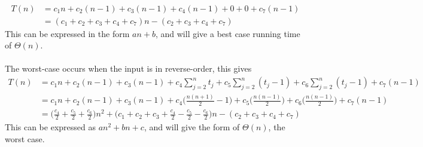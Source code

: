 \documentclass{article}
\begin{document}
\\
\begin{equation*}
\begin{split}
T(n) & = c_1n + c_2(n-1) + c_3(n-1) + c_4(n-1) + 0 + 0 + c_7(n-1) \\
  & = (c_1 + c_2 + c_3 + c_4 + c_7)n - (c_2 + c_3 + c_4 + c_7)
\end{split}
\end{equation*}
This can be expressed in the form $an + b$, and will give a best case running time of $\Theta(n)$.
\\
\\
The worst-case occurs when the input is in reverse-order, this gives
\begin{equation*}
\begin{split}
T(n) & = c_1n + c_2(n-1) + c_3(n-1) + c_4\sum_{j=2}^{n} t_j + c_5\sum_{j=2}^{n} (t_j-1) + c_6\sum_{j=2}^{n} (t_j-1) + c_7(n-1) \\
  & = c_1n + c_2(n-1) + c_3(n-1) + c_4\bigg(\frac{n(n+1)}{2} - 1 \bigg) + c_5\bigg(\frac{n(n-1)}{2}\bigg) + c_6\bigg(\frac{n(n-1)}{2}\bigg) + c_7(n-1) \\
  & = \bigg(\frac{c_4}{2} + \frac{c_5}{2} + \frac{c_6}{2}\bigg)n^2 + \bigg(c_1 + c_2 + c_3 + \frac{c_4}{2} - \frac{c_5}{2} - \frac{c_6}{2}\bigg)n - (c_2 + c_3 + c_4 + c_7)
\end{split}
\end{equation*}
This can be expressed as $an^2 + bn + c$, and will give the form of $\Theta(n)$, the worst case.
\\
\newpage
\end{document}

